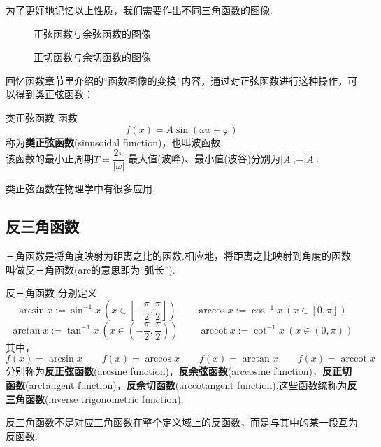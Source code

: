 \documentclass[lang=cn, zihao=5]{elegantbook}
\DeclareMathOperator{\arccot}{arccot}
\begin{document}
为了更好地记忆以上性质，我们需要作出不同三角函数的图像.

\begin{figure}[h!]
	\centering
	
	\caption{正弦函数与余弦函数的图像}
\end{figure}

\begin{figure}[h!]
	\centering
	
	\caption{正切函数与余切函数的图像}
\end{figure}

回忆函数章节里介绍的“函数图像的变换”内容，通过对正弦函数进行这种操作，可以得到类正弦函数：

\begin{definition}{类正弦函数}
    函数$$f(x)=A \sin (\omega x + \varphi)$$
    称为\textbf{类正弦函数}(sinusoidal function)，也叫波函数.\\
    该函数的最小正周期$T=\dfrac{2\pi}{|\omega|}$.最大值(波峰)、最小值(波谷)分别为$|A|$,$-|A|$.
\end{definition}

类正弦函数在物理学中有很多应用.

\subsection{反三角函数}

三角函数是将角度映射为距离之比的函数.相应地，将距离之比映射到角度的函数叫做反三角函数(arc的意思即为“弧长”).

\begin{definition}{反三角函数}
    分别定义
    $$\arcsin{x}:=\sin ^{-1}x~(x \in [-\frac{\pi}{2} ,\frac{\pi}{2}]) \qquad \arccos{x}:=\cos ^{-1}x~(x \in [0,\pi])$$
    $$\arctan{x}:= \tan ^{-1}x~(x \in (-\frac{\pi}{2},\frac{\pi}{2})) \qquad \arccot{x}:=\cot ^{-1}x~(x \in (0,\pi))$$
    其中，$$f(x)=\arcsin x \qquad f(x)=\arccos x \qquad f(x)=\arctan x \qquad f(x)=\arccot x$$
    分别称为\textbf{反正弦函数}(arcsine function)，\textbf{反余弦函数}(arccosine function)，\textbf{反正切函数}(arctangent function)，\textbf{反余切函数}(arccotangent function).这些函数统称为\textbf{反三角函数}(inverse trigonometric function).
\end{definition}
\begin{note}
    反三角函数不是对应三角函数在整个定义域上的反函数，而是与其中的某一段互为反函数.
\end{note}
\end{document}

